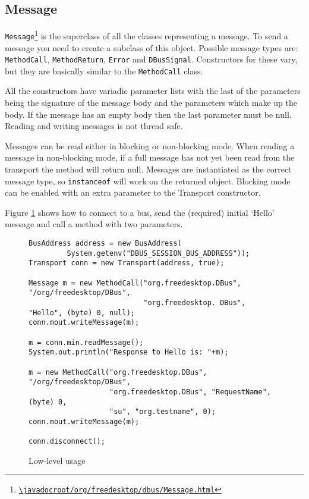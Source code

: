 \documentclass[a4paper,12pt]{article}
\begin{document}
\subsection{Message}

{\tt Message\footnote{\url{\javadocroot/org/freedesktop/dbus/Message.html}}} is the
superclass of all the classes representing a message. To send a message you
need to create a subclass of this object. Possible message types are: {\tt
MethodCall}, {\tt MethodReturn}, {\tt Error} and {\tt DBusSignal}. Constructors
for these vary, but they are basically similar to the {\tt MethodCall} class.

All the constructors have variadic parameter lists with the last of the
parameters being the signature of the message body and the parameters which
make up the body. If the message has an empty body then the last parameter must
be null. Reading and writing messages is not thread safe.

Messages can be read either in blocking or non-blocking mode. When reading a
message in non-blocking mode, if a full message has not yet been read from the
transport the method will return null. Messages are instantiated as the correct
message type, so {\tt instanceof} will work on the returned object. Blocking
mode can be enabled with an extra parameter to the Transport constructor.

Figure \ref{fig:lowlevel} shows how to connect to a bus, send the (required)
initial `Hello' message and 
call a method with two parameters.

\begin{figure}[htb]
\begin{center}
\begin{verbatim}
BusAddress address = new BusAddress(
         System.getenv("DBUS_SESSION_BUS_ADDRESS"));
Transport conn = new Transport(address, true);

Message m = new MethodCall("org.freedesktop.DBus", "/org/freedesktop/DBus", 
                           "org.freedesktop. DBus", "Hello", (byte) 0, null);
conn.mout.writeMessage(m);

m = conn.min.readMessage();
System.out.println("Response to Hello is: "+m);

m = new MethodCall("org.freedesktop.DBus", "/org/freedesktop/DBus", 
                   "org.freedesktop.DBus", "RequestName", (byte) 0, 
                   "su", "org.testname", 0);
conn.mout.writeMessage(m);

conn.disconnect();
\end{verbatim}
\end{center}
\caption{Low-level usage}
\label{fig:lowlevel}
\end{figure}
\end{document}
